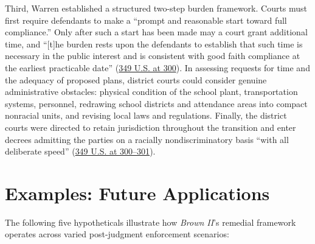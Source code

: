 \documentclass[12pt]{article}
\begin{document}
Third, Warren established a structured two-step burden framework. Courts must first require defendants to make a ``prompt and reasonable start toward full compliance.'' Only after such a start has been made may a court grant additional time, and ``[t]he burden rests upon the defendants to establish that such time is necessary in the public interest and is consistent with good faith compliance at the earliest practicable date'' (\href{https://supreme.justia.com/cases/federal/us/349/294/}{349 U.S. at 300}). In assessing requests for time and the adequacy of proposed plans, district courts could consider genuine administrative obstacles: physical condition of the school plant, transportation systems, personnel, redrawing school districts and attendance areas into compact nonracial units, and revising local laws and regulations. Finally, the district courts were directed to retain jurisdiction throughout the transition and enter decrees admitting the parties on a racially nondiscriminatory basis ``with all deliberate speed'' (\href{https://supreme.justia.com/cases/federal/us/349/294/}{349 U.S. at 300--301}).

\section{Examples: Future Applications}

The following five hypotheticals illustrate how \textit{Brown II}'s remedial framework operates across varied post-judgment enforcement scenarios:
\end{document}
